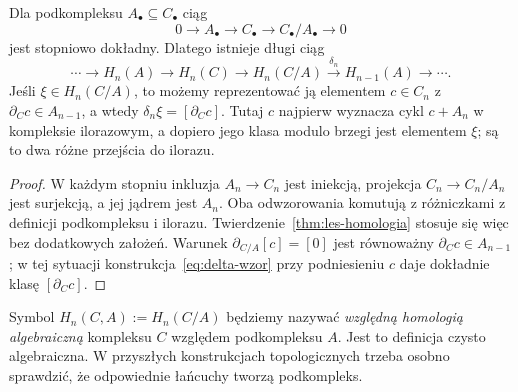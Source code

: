 \begin{stwierdzenie}
\label{prop:ses-iloraz}
Dla podkompleksu $A_\bullet\subseteq C_\bullet$
ciąg
\[
 0\longrightarrow A_\bullet
 \longrightarrow C_\bullet
 \longrightarrow C_\bullet/A_\bullet
 \longrightarrow0
\]
jest stopniowo dokładny. Dlatego istnieje
długi ciąg
\begin{equation}\label{eq:les-iloraz}
 \cdots\to H_n(A)\to H_n(C)\to H_n(C/A)
 \xrightarrow{\delta_n}H_{n-1}(A)\to\cdots.
\end{equation}
Jeśli $\xi\in H_n(C/A)$, to możemy
reprezentować ją elementem $c\in C_n$
z $\partial_Cc\in A_{n-1}$, a wtedy
$\delta_n\xi=[\partial_Cc]$. Tutaj $c$ najpierw wyznacza cykl
$c+A_n$ w kompleksie ilorazowym, a dopiero jego klasa modulo
brzegi jest elementem $\xi$; są to dwa różne przejścia do ilorazu.
\end{stwierdzenie}
\begin{proof}
W każdym stopniu inkluzja $A_n\to C_n$
jest iniekcją, projekcja $C_n\to C_n/A_n$
jest surjekcją, a jej jądrem jest $A_n$.
Oba odwzorowania komutują z różniczkami
z definicji podkompleksu i ilorazu.
Twierdzenie~\ref{thm:les-homologia}
stosuje się więc bez dodatkowych
założeń. Warunek
$\partial_{C/A}[c]=[0]$ jest równoważny
$\partial_Cc\in A_{n-1}$; w tej sytuacji
konstrukcja~\eqref{eq:delta-wzor}
przy podniesieniu $c$ daje dokładnie
klasę $[\partial_Cc]$.
\end{proof}

Symbol $H_n(C,A):=H_n(C/A)$ będziemy
nazywać \emph{względną homologią
algebraiczną} kompleksu $C$ względem
podkompleksu $A$. Jest to definicja
czysto algebraiczna. W przyszłych
konstrukcjach topologicznych trzeba
osobno sprawdzić, że odpowiednie
łańcuchy tworzą podkompleks.

